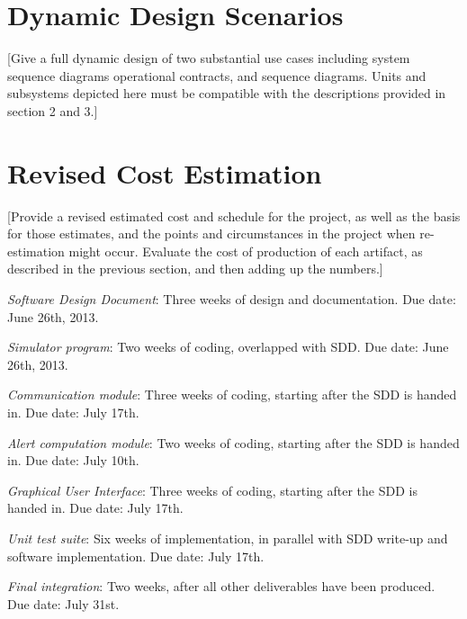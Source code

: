 \documentclass{article}
\begin{document}
\section{Dynamic Design Scenarios} %

[Give a full dynamic design of two substantial use cases including system sequence diagrams operational contracts, and sequence diagrams. Units and subsystems depicted here must be compatible with the descriptions provided in section 2 and 3.]

\section{Revised Cost Estimation} %

[Provide a revised estimated cost and schedule for the project, as well as the basis for those estimates, and the points and circumstances in the project when re-estimation might occur.
Evaluate the cost of production of each artifact, as described in the previous section, and then adding up the numbers.]

\emph{Software Design Document}: Three weeks of design and documentation. Due date: June 26th, 2013.

\emph{Simulator program}: Two weeks of coding, overlapped with SDD. Due date: June 26th, 2013.

\emph{Communication module}: Three weeks of coding, starting after the SDD is handed in. Due date: July 17th.

\emph{Alert computation module}: Two weeks of coding, starting after the SDD is handed in. Due date: July 10th.

\emph{Graphical User Interface}: Three weeks of coding, starting after the SDD is handed in. Due date: July 17th.

\emph{Unit test suite}: Six weeks of implementation, in parallel with SDD write-up and software implementation. Due date: July 17th.

\emph{Final integration}: Two weeks, after all other deliverables have been produced. Due date: July 31st.
\end{document}
